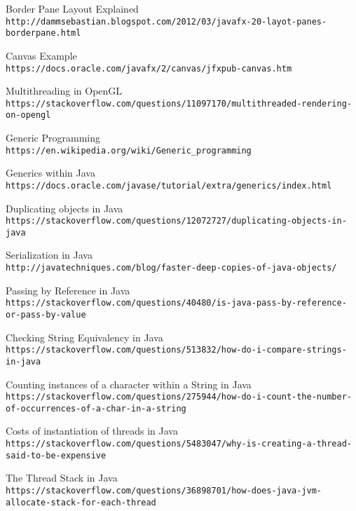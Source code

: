 \documentclass[../../main.tex]{subfiles}
\begin{document}
\begin{thebibliography}{9}
Border Pane Layout Explained\\
\texttt{http://dammsebastian.blogspot.com/2012/03/javafx-20-layot-panes-borderpane.html}

Canvas Example\\
\texttt{https://docs.oracle.com/javafx/2/canvas/jfxpub-canvas.htm}

Multithreading in OpenGL\\
\texttt{https://stackoverflow.com/questions/11097170/multithreaded-rendering-on-opengl}

Generic Programming\\
\texttt{https://en.wikipedia.org/wiki/Generic\_programming}

Generics within Java\\
\texttt{https://docs.oracle.com/javase/tutorial/extra/generics/index.html}

Duplicating objects in Java\\
\texttt{https://stackoverflow.com/questions/12072727/duplicating-objects-in-java}

Serialization in Java\\
\texttt{http://javatechniques.com/blog/faster-deep-copies-of-java-objects/}

Passing by Reference in Java\\
\texttt{https://stackoverflow.com/questions/40480/is-java-pass-by-reference-or-pass-by-value}

Checking String Equivalency in Java\\
\texttt{https://stackoverflow.com/questions/513832/how-do-i-compare-strings-in-java}

Counting instances of a character within a String in Java\\
\texttt{https://stackoverflow.com/questions/275944/how-do-i-count-the-number-
of-occurrences-of-a-char-in-a-string}

Costs of instantiation of threads in Java\\
\texttt{https://stackoverflow.com/questions/5483047/why-is-creating-a-thread-said-to-be-expensive}

The Thread Stack in Java\\
\texttt{https://stackoverflow.com/questions/36898701/how-does-java-jvm-allocate-stack-for-each-thread}


\end{thebibliography}
\end{document}
